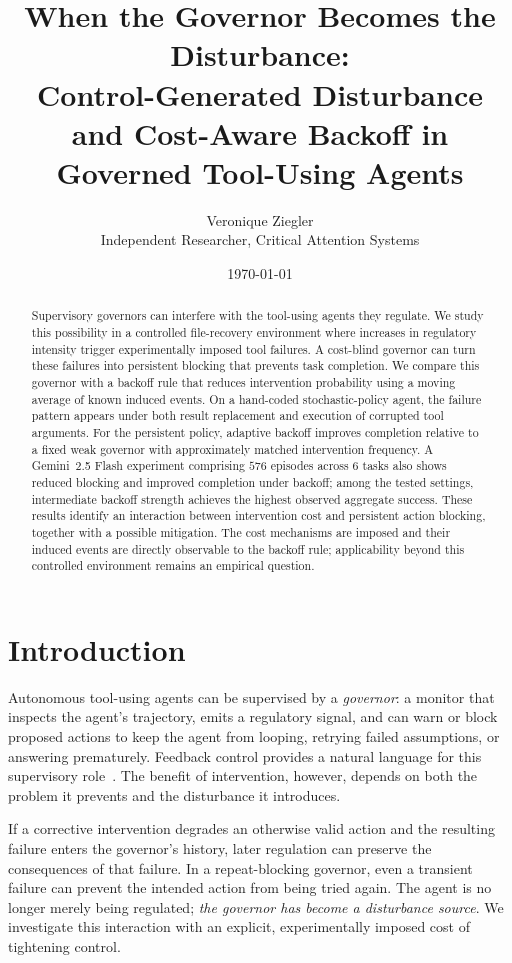 \documentclass[11pt]{article}
\title{\textbf{When the Governor Becomes the Disturbance:}\\[0.3em]
Control-Generated Disturbance and Cost-Aware Backoff in Governed Tool-Using Agents}
\author{Veronique Ziegler\\Independent Researcher, Critical Attention Systems}
\date{\today}
\newcommand{\poweredTasks}{6}
\newcommand{\poweredEpisodes}{576}
\begin{document}
\maketitle

\begin{abstract}
Supervisory governors can interfere with the tool-using agents they regulate.
We study this possibility in a controlled file-recovery environment where
increases in regulatory intensity trigger experimentally imposed tool failures.
A cost-blind governor can turn these failures into persistent blocking that
prevents task completion. We compare this governor with a backoff rule that
reduces intervention probability using a moving average of known induced
events. On a hand-coded stochastic-policy agent, the failure pattern appears
under both result replacement and execution of corrupted tool arguments. For
the persistent policy, adaptive backoff improves completion relative to a fixed
weak governor with approximately matched intervention frequency. A Gemini~2.5
Flash experiment comprising $\poweredEpisodes$ episodes across
$\poweredTasks$ tasks also shows reduced blocking and improved completion
under backoff; among the tested settings, intermediate backoff strength
achieves the highest observed aggregate success. These results identify an
interaction between intervention cost and persistent action blocking, together
with a possible mitigation. The cost mechanisms are imposed and their induced
events are directly observable to the backoff rule; applicability beyond this
controlled environment remains an empirical question.
\end{abstract}

\section{Introduction}

Autonomous tool-using agents can be supervised by a
\emph{governor}: a monitor that inspects the agent's trajectory, emits a
regulatory signal, and can warn or block proposed actions to keep the agent
from looping, retrying failed assumptions, or answering prematurely. Feedback
control provides a natural language for this supervisory
role~\cite{astrom2008feedback}. The benefit of intervention, however, depends
on both the problem it prevents and the disturbance it introduces.

If a corrective intervention degrades an otherwise valid action and the
resulting failure enters the governor's history, later regulation can preserve
the consequences of that failure. In a repeat-blocking governor, even a
transient failure can prevent the intended action from being tried again.
The agent is no longer merely being regulated; \emph{the governor has become a
disturbance source}. We investigate this interaction with an explicit,
experimentally imposed cost of tightening control.
\end{document}
